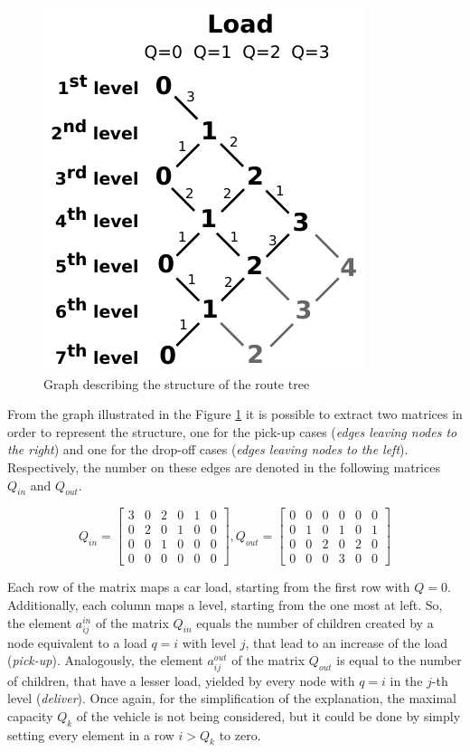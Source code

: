 \documentclass[tuberlin,cic,tc,openright,english,noabntcite,oneside]{iiufrgs}
\begin{document}
\begin{figure}[H]
	\centering
    \caption{Graph describing the structure of the route tree}
    \includegraphics{fig_load_bus_scheme}\par
    \label{fig:load_bus_scheme}
\end{figure}

From the graph illustrated in the Figure \ref{fig:load_bus_scheme} it is possible to extract two matrices in order to represent the structure, one for the pick-up cases (\emph{edges leaving nodes to the right}) and one for the drop-off cases (\emph{edges leaving nodes to the left}). Respectively, the number on these edges are denoted in the following matrices $Q_{in}$ and $Q_{out}$.

$$
Q_{in} = 
\begin{bmatrix}
3 & 0 & 2 & 0 & 1 & 0\\
0 & 2 & 0 & 1 & 0 & 0\\
0 & 0 & 1 & 0 & 0 & 0\\
0 & 0 & 0 & 0 & 0 & 0
\end{bmatrix}
,
Q_{out} = 
\begin{bmatrix}
0 & 0 & 0 & 0 & 0 & 0\\
0 & 1 & 0 & 1 & 0 & 1\\
0 & 0 & 2 & 0 & 2 & 0\\
0 & 0 & 0 & 3 & 0 & 0
\end{bmatrix}
$$

Each row of the matrix maps a car load, starting from the first row with $Q=0$. Additionally, each column maps a level, starting from the one most at left. So, the element $a^{in}_{ij}$ of the matrix $Q_{in}$ equals the number of children created by a node equivalent to a load $q=i$ with level $j$, that lead to an increase of the load (\emph{pick-up}). Analogously, the element $a^{out}_{ij}$ of the matrix $Q_{out}$ is equal to the number of children, that have a lesser load, yielded by every node with $q=i$ in the $j$-th level (\emph{deliver}). Once again, for the simplification of the explanation, the maximal capacity $Q_k$ of the vehicle is not being considered, but it could be done by simply setting every element in a row $i>Q_k$ to zero.
\end{document}
